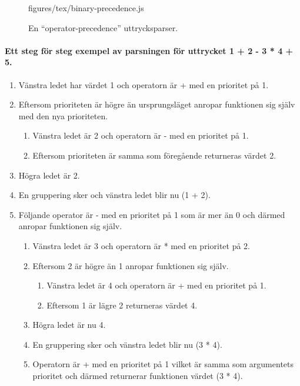 \begin{figure}[ht]
    {figures/tex/binary-precedence.js}
  \caption{En ``operator-precedence'' uttrycksparser.}
  \label{fig:binprecedence}
\end{figure}

\paragraph{Ett steg för steg exempel av parsningen för uttrycket 1 + 2 - 3 * 4
+ 5.}

\begin{enumerate}\itemsep1pt \parskip0pt 
  \item Vänstra ledet har värdet 1 och operatorn är + med en prioritet på 1.
  \item Eftersom prioriteten är högre än ursprungsläget anropar funktionen sig
    själv med den nya prioriteten.
    \begin{enumerate}
      \item Vänstra ledet är 2 och operatorn är - med en prioritet på 1.
      \item Eftersom prioriteten är samma som föregående returneras värdet 2.
    \end{enumerate}
  \item Högra ledet är 2.
  \item En gruppering sker och vänstra ledet blir nu (1 + 2).
  \item Följande operator är - med en prioritet på 1 som är mer än 0 och
    därmed anropar funktionen sig själv.
    \begin{enumerate}
      \item Vänstra ledet är 3 och operatorn är * med en prioritet på 2.
      \item Eftersom 2 är högre än 1 anropar funktionen sig själv.
      \begin{enumerate}
        \item Vänstra ledet är 4 och operatorn är + med en prioritet på 1.
        \item Eftersom 1 är lägre 2 returneras värdet 4.
      \end{enumerate}
      \item Högra ledet är nu 4.
      \item En gruppering sker och vänstra ledet blir nu (3 * 4).
      \item Operatorn är + med en prioritet på 1 vilket är samma som
        argumentets prioritet och därmed returnerar funktionen värdet (3 * 4).

\end{enumerate}
\end{enumerate}
